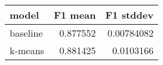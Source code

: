 \begin{tabular}{lrr}
\toprule
 model    &   F1 mean &   F1 stddev \\
\midrule
 baseline &  0.877552 &  0.00784082 \\
 k-means  &  0.881425 &  0.0103166  \\
\bottomrule
\end{tabular}